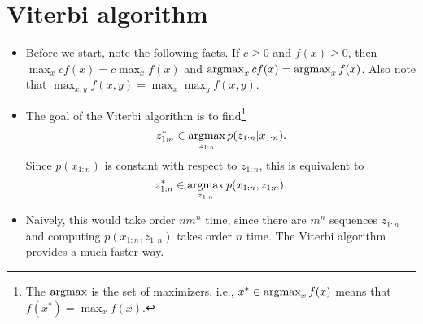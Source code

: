 \documentclass[12pt]{article}
\begin{document}
\section{Viterbi algorithm}

\begin{itemize}
\item Before we start, note the following facts. If $c \geq 0$ and $f(x) \geq 0$, then $\max_x c f(x) = c \max_x f(x)$ and $\operatorname*{argmax}_x c f(x) = \operatorname*{argmax}_x f(x)$. Also note that $\max_{x,y} f(x,y) = \max_x \max_y f(x,y)$.
\item The goal of the Viterbi algorithm is to find\footnote{The $\operatorname*{argmax}$ is the set of maximizers, i.e., $x^* \in \operatorname*{argmax}_x f(x)$ means that $f(x^*) = \max_x f(x)$.}
$$ z_{1:n}^* \in \operatorname*{argmax}_{z_{1:n}} p(z_{1:n} | x_{1:n}). $$
Since $p(x_{1:n})$ is constant with respect to $z_{1:n}$, this is equivalent to
$$ z_{1:n}^* \in \operatorname*{argmax}_{z_{1:n}} p(x_{1:n},z_{1:n}). $$
\item Naively, this would take order $n m^n$ time, since there are $m^n$ sequences $z_{1:n}$ and computing $p(x_{1:n},z_{1:n})$ takes order $n$ time. The Viterbi algorithm provides a much faster way.
\end{itemize}
\end{document}
